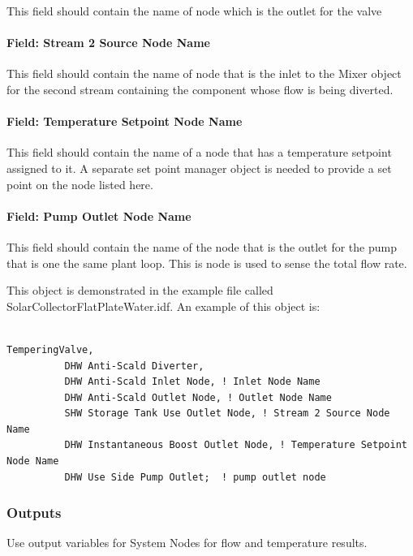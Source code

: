 This field should contain the name of node which is the outlet for the valve

\paragraph{Field: Stream 2 Source Node Name}\label{field-stream-2-source-node-name}

This field should contain the name of node that is the inlet to the Mixer object for the second stream containing the component whose flow is being diverted.

\paragraph{Field: Temperature Setpoint Node Name}\label{field-temperature-setpoint-node-name-000}

This field should contain the name of a node that has a temperature setpoint assigned to it. A separate set point manager object is needed to provide a set point on the node listed here.

\paragraph{Field: Pump Outlet Node Name}\label{field-pump-outlet-node-name}

This field should contain the name of the node that is the outlet for the pump that is one the same plant loop. This is node is used to sense the total flow rate.

This object is demonstrated in the example file called SolarCollectorFlatPlateWater.idf. An example of this object is:

\begin{lstlisting}

TemperingValve,
          DHW Anti-Scald Diverter,
          DHW Anti-Scald Inlet Node, ! Inlet Node Name
          DHW Anti-Scald Outlet Node, ! Outlet Node Name
          SHW Storage Tank Use Outlet Node, ! Stream 2 Source Node Name
          DHW Instantaneous Boost Outlet Node, ! Temperature Setpoint Node Name
          DHW Use Side Pump Outlet;  ! pump outlet node
\end{lstlisting}

\subsubsection{Outputs}\label{outputs-023}

Use output variables for System Nodes for flow and temperature results.
